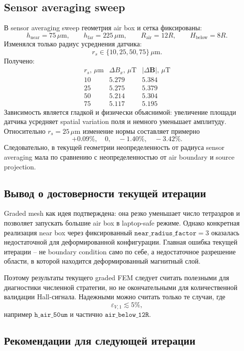 \documentclass[12pt,a4paper]{article}
\begin{document}
\subsection*{Sensor averaging sweep}

В sensor averaging sweep геометрия air box и сетка фиксированы:
\[
    h_{\mathrm{near}}=75\,\mu\mathrm{m},\qquad
    h_{\mathrm{far}}=225\,\mu\mathrm{m},\qquad
    R_{\mathrm{air}}=12R,\qquad
    H_{\mathrm{below}}=8R.
\]
Изменялся только радиус усреднения датчика:
\[
    r_s\in\{10,25,50,75\}\,\mu\mathrm{m}.
\]
Получено:
\[
\begin{array}{lrr}
r_s,\,\mu\mathrm{m} & \Delta B_x,\,\mu\mathrm{T} & |\Delta\mathbf B|,\,\mu\mathrm{T}\\
\hline
10 & 5.279 & 5.384\\
25 & 5.275 & 5.379\\
50 & 5.214 & 5.304\\
75 & 5.117 & 5.195
\end{array}
\]
Зависимость является гладкой и физически объяснимой: увеличение площади датчика
усредняет spatial variation поля и немного уменьшает амплитуду. Относительно
\(r_s=25\,\mu\mathrm{m}\) изменение нормы составляет примерно
\[
    +0.09\%,\quad 0,\quad -1.40\%,\quad -3.42\%.
\]
Следовательно, в текущей геометрии неопределенность от радиуса sensor averaging
мала по сравнению с неопределенностью от air boundary и source projection.

\subsection*{Вывод о достоверности текущей итерации}

Graded mesh как идея подтверждена: она резко уменьшает число тетраэдров и
позволяет запускать большие air box в laptop-safe режиме. Однако конкретная
реализация near box через фиксированный \(\texttt{near\_radius\_factor}=3\)
оказалась недостаточной для деформированной конфигурации. Главная ошибка
текущей итерации -- не boundary condition само по себе, а недостаточное
разрешение области, в которой находится деформированный магнитный слой.

Поэтому результаты текущего graded FEM следует считать полезными для
диагностики численной стратегии, но не окончательными для количественной
валидации Hall-сигнала. Надежными можно считать только те случаи, где
\[
    \varepsilon_{V,1}\lesssim 5\%,
\]
например \(\texttt{h\_air\_50um}\) и частично \(\texttt{air\_below\_12R}\).

\subsection*{Рекомендации для следующей итерации}
\end{document}
